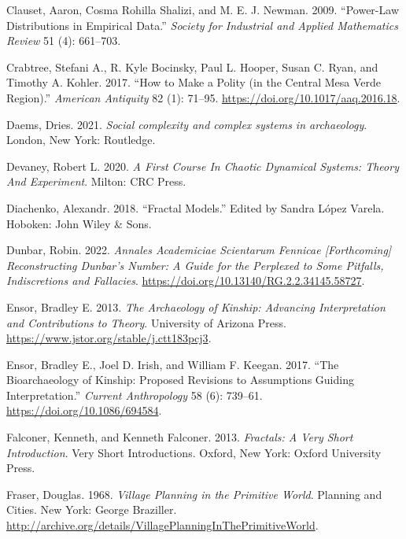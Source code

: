 \documentclass[
  12pt,
]{book}
\newlength{\cslhangindent}
\newlength{\cslentryspacingunit} %
\newenvironment{CSLReferences}[2] %
 {%
  \setlength{\parindent}{0pt}
  \ifodd #1
  \let\oldpar\par
  \def\par{\hangindent=\cslhangindent\oldpar}
  \fi
  \setlength{\parskip}{#2\cslentryspacingunit}
 }%
 {}
\begin{document}
\begin{CSLReferences}{1}{0}
\leavevmode{}%
Clauset, Aaron, Cosma Rohilla Shalizi, and M. E. J. Newman. 2009. {``Power-Law Distributions in Empirical Data.''} \emph{Society for Industrial and Applied Mathematics Review} 51 (4): 661--703.

\leavevmode{}%
Crabtree, Stefani A., R. Kyle Bocinsky, Paul L. Hooper, Susan C. Ryan, and Timothy A. Kohler. 2017. {``How to Make a Polity (in the Central Mesa Verde Region).''} \emph{American Antiquity} 82 (1): 71--95. \url{https://doi.org/10.1017/aaq.2016.18}.

\leavevmode{}%
Daems, Dries. 2021. \emph{Social complexity and complex systems in archaeology}. London, New York: Routledge.

\leavevmode{}%
Devaney, Robert L. 2020. \emph{A First Course In Chaotic Dynamical Systems: Theory And Experiment}. Milton: CRC Press.

\leavevmode{}%
Diachenko, Alexandr. 2018. {``Fractal Models.''} Edited by Sandra López Varela. Hoboken: John Wiley \& Sons.

\leavevmode{}%
Dunbar, Robin. 2022. \emph{Annales Academiciae Scientarum Fennicae {[}Forthcoming{]} Reconstructing Dunbar's Number: A Guide for the Perplexed to Some Pitfalls, Indiscretions and Fallacies}. \url{https://doi.org/10.13140/RG.2.2.34145.58727}.

\leavevmode{}%
Ensor, Bradley E. 2013. \emph{The Archaeology of Kinship: Advancing Interpretation and Contributions to Theory}. University of Arizona Press. \url{https://www.jstor.org/stable/j.ctt183pcj3}.

\leavevmode{}%
Ensor, Bradley E., Joel D. Irish, and William F. Keegan. 2017. {``The Bioarchaeology of Kinship: Proposed Revisions to Assumptions Guiding Interpretation.''} \emph{Current Anthropology} 58 (6): 739--61. \url{https://doi.org/10.1086/694584}.

\leavevmode{}%
Falconer, Kenneth, and Kenneth Falconer. 2013. \emph{Fractals: A Very Short Introduction}. Very Short Introductions. Oxford, New York: Oxford University Press.

\leavevmode{}%
Fraser, Douglas. 1968. \emph{Village Planning in the Primitive World}. Planning and Cities. New York: George Braziller. \url{http://archive.org/details/VillagePlanningInThePrimitiveWorld}.


\end{CSLReferences}
\end{document}
